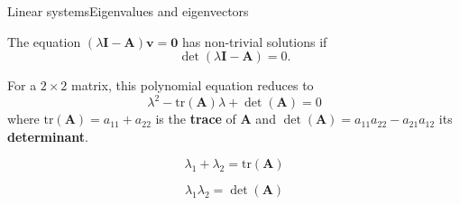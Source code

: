 \documentclass[usenames,dvipsnames,svgnames,10pt,aspectratio=169]{beamer}
\begin{document}
\begin{frame}[t, c]{Linear systems}{Eigenvalues and eigenvectors}
  \begin{minipage}{.68\textwidth}
    The equation $\left( \lambda \bm{I} - \bm{A} \right) \bm{v} = \bm{0}$ has non-trivial solutions if
    \[
    \det \left( \lambda \bm{I} - \bm{A} \right) = 0.
    \]

    For a $2 \times 2$ matrix, this polynomial equation reduces to
    \[
    \lambda^2 - \text{tr}(\bm{A}) \lambda + \det(\bm{A}) = 0
    \]
    where $\text{tr}(\bm{A}) = a_{11} + a_{22}$ is the \textbf{trace} of $\bm{A}$ and $\det(\bm{A}) = a_{11}a_{22} - a_{21}a_{12}$ its \textbf{determinant}.
  \end{minipage}%
  \hfill
  \begin{minipage}{.28\textwidth}
    \centering
    \[
    \lambda_1 + \lambda_2 = \text{tr}(\bm{A})
    \]

    \[
    \lambda_1 \lambda_2 = \det(\bm{A})
    \]
  \end{minipage}

  \vspace{1cm}
\end{frame}
\end{document}

